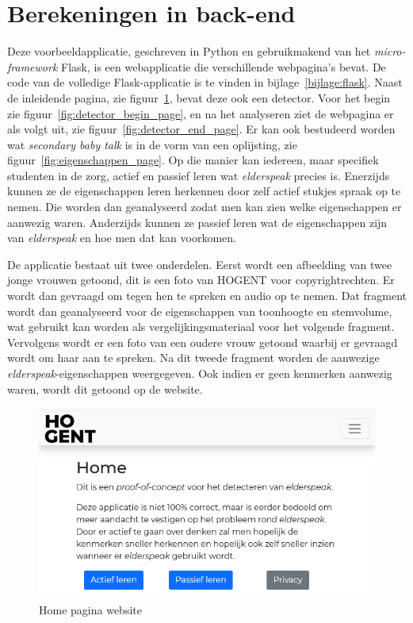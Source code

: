 \section{Berekeningen in back-end}
Deze voorbeeldapplicatie, geschreven in Python en gebruikmakend van het \textit{micro-framework} Flask, is een webapplicatie die verschillende webpagina's bevat. De code van de volledige Flask-applicatie is te vinden in bijlage~\ref{bijlage:flask}. Naast de inleidende pagina, zie figuur~\ref{fig:home_page}, bevat deze ook een detector. Voor het begin zie figuur~\ref{fig:detector_begin_page}, en na het analyseren ziet de webpagina er als volgt uit, zie figuur~\ref{fig:detector_end_page}. Er kan ook bestudeerd worden wat \textit{secondary baby talk} is in de vorm van een oplijsting, zie figuur~\ref{fig:eigenschappen_page}. Op die manier kan iedereen, maar specifiek studenten in de zorg, actief en passief leren wat \textit{elderspeak} precies is. Enerzijds kunnen ze de eigenschappen leren herkennen door zelf actief stukjes spraak op te nemen. Die worden dan geanalyseerd zodat men kan zien welke eigenschappen er aanwezig waren. Anderzijds kunnen ze passief leren wat de eigenschappen zijn van \textit{elderspeak} en hoe men dat kan voorkomen.

De applicatie bestaat uit twee onderdelen. Eerst wordt een afbeelding van twee jonge vrouwen getoond, dit is een foto van HOGENT voor copyrightrechten. Er wordt dan gevraagd om tegen hen te spreken en audio op te nemen. Dat fragment wordt dan geanalyseerd voor de eigenschappen van toonhoogte en stemvolume, wat gebruikt kan worden als vergelijkingsmateriaal voor het volgende fragment.
Vervolgens wordt er een foto van een oudere vrouw getoond waarbij er gevraagd wordt om haar aan te spreken. Na dit tweede fragment worden de aanwezige \textit{elderspeak}-eigenschappen weergegeven. Ook indien er geen kenmerken aanwezig waren, wordt dit getoond op de website.


\begin{figure}
    \centering
    \includegraphics[width=1\textwidth]{./img/home_website}
    \caption{\label{fig:home_page} Home pagina website}
\end{figure}


